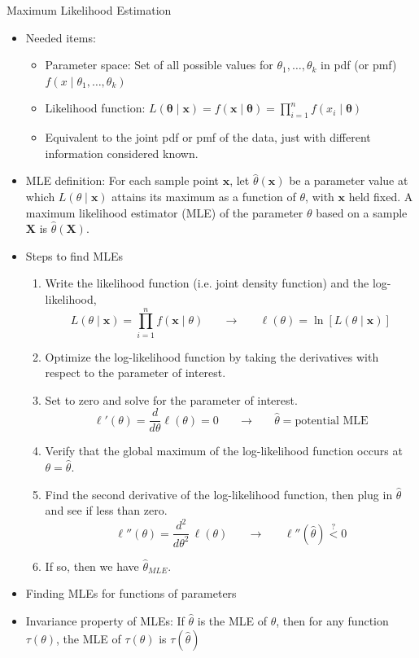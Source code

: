 \documentclass{article}
\begin{document}
Maximum Likelihood Estimation
\begin{itemize}
    \item Needed items:
    \begin{itemize}
        \item Parameter space: Set of all possible values for $\theta_1, \ldots, \theta_k$ in pdf (or pmf) $f(x \mid \theta_1, \ldots, \theta_k)$ 
        \item Likelihood function: $L(\boldsymbol{\theta} \mid \mathbf{x}) = f(\mathbf{x} \mid \boldsymbol{\theta}) = \displaystyle \prod_{i = 1}^n f(x_i \mid \boldsymbol{\theta})$
        \item[] Equivalent to the joint pdf or pmf of the data, just with different information considered known.
    \end{itemize}
    \item MLE definition: For each sample point $\mathbf{x}$, let $\hat{\theta}(\boldsymbol{x})$ be a parameter value at which $L(\theta \mid \mathbf{x})$ attains its maximum as a function of $\theta$, with $\mathbf{x}$ held fixed. A maximum likelihood estimator (MLE) of the parameter $\theta$ based on a sample $\mathbf{X}$ is $\hat{\theta}(\mathbf{X})$.
    \item Steps to find MLEs
    \begin{enumerate}
        \item Write the likelihood function (i.e. joint density function) and the log-likelihood,
        \[L(\theta \mid \mathbf{x}) = \prod_{i = 1}^n f(\mathbf{x} \mid \theta) \hspace{20pt} \rightarrow \hspace{20pt} \ell(\theta) = \ln[L(\theta \mid \mathbf{x})]\]
        \item Optimize the log-likelihood function by taking the derivatives with respect to the parameter of interest.
        \item[] Set to zero and solve for the parameter of interest.
        \[\ell'(\theta) = \frac{d}{d \theta} \ell(\theta) = 0 \hspace{20pt} \rightarrow \hspace{20pt} \hat{\theta} = \text{potential MLE}\]
        \item Verify that the global maximum of the log-likelihood function occurs at $\theta = \hat{\theta}$.
        \item[] Find the second derivative of the log-likelihood function, then plug in $\hat{\theta}$ and see if less than zero.
        \[\ell''(\theta) = \frac{d^2}{d \theta^2} \, \ell(\theta) \hspace{20pt} \rightarrow \hspace{20pt} \ell''(\hat{\theta}) \overset{?}< 0\]
        \item[] If so, then we have $\hat{\theta}_{MLE}$.
    \end{enumerate}\bigskip
    \item Finding MLEs for functions of parameters
    \item[] Invariance property of MLEs: If $\hat{\theta}$ is the MLE of $\theta$, then for any function $\tau(\theta)$, the MLE of $\tau(\theta)$ is $\tau(\hat\theta)$
\end{itemize}\newpage
\end{document}
